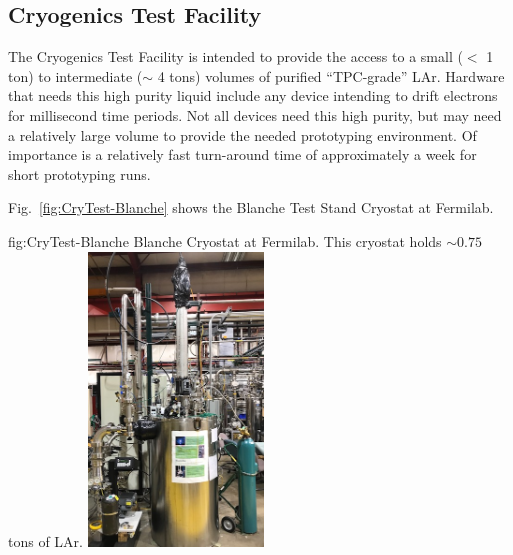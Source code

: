 \subsection{Cryogenics Test Facility}
\label{sec:fdsp-slow-cryo-test-facil}
The Cryogenics Test Facility is intended to provide the access to a small ($<$ \num{1} ton) to intermediate ($\sim$ \num{4} tons) volumes of purified ``TPC-grade'' LAr. Hardware that needs this high purity liquid include any device intending to drift electrons for millisecond time periods. Not all devices need this high purity, but may need a relatively large volume to provide the needed prototyping environment. Of importance is a relatively fast turn-around time of approximately a week for short prototyping runs.

Fig.~\ref{fig:CryTest-Blanche} shows the Blanche Test Stand Cryostat at Fermilab.

\begin{dunefigure}{fig:CryTest-Blanche} 
  {Blanche Cryostat at Fermilab. This cryostat holds $\sim 0.75$ tons of LAr.}
  \includegraphics[width=0.35\textwidth]{figures/BlancheCryostat.jpg}%
\end{dunefigure}
